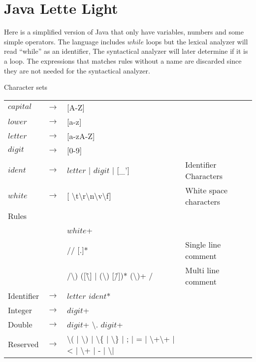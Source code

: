 \chapter{Java Lette Light}\label{reglang}
Here is a simplified version of Java that only have variables, numbers and some
simple operators. The language includes $while$ loops but the lexical analyzer
will read ``while'' as an identifier, The syntactical analyzer will later
determine if it is a loop. The expressions that matches rules without a name
are discarded since they are not needed for the syntactical analyzer.

Character sets\\
\begin{tabular}{l c l l}
$capital$ & $\rightarrow$ & [A-Z]\\
$lower$   & $\rightarrow$ & [a-z]\\
$letter$  & $\rightarrow$ & [a-zA-Z]\\
$digit$   & $\rightarrow$ & [0-9]\\
$ident$   & $\rightarrow$ & $letter$ | $digit$ | [\_'] & Identifier Characters\\
$white$   & $\rightarrow$ & [ \textbackslash{t}\textbackslash{r}\textbackslash{n}\textbackslash{v}\textbackslash{f}] & White space characters\\
Rules\\
& & $white$+\\
& & // [.]* & Single line comment\\
& & /\textbackslash*) ([\^\textbackslash*] | (\textbackslash*) [\^/])*
    (\textbackslash*)+ / & Multi line comment\\
Identifier & $\rightarrow$ & $letter$ $ident$*\\
Integer    & $\rightarrow$ & $digit$+\\
Double     & $\rightarrow$ & $digit$+ \textbackslash. $digit$+\\
Reserved   & $\rightarrow$ & \textbackslash( | \textbackslash) | \textbackslash\{
                         | \textbackslash\} | ; | = | \textbackslash+\textbackslash+
                         | < | \textbackslash+ | - | \textbackslash* | \/ \\ %
\end{tabular}
